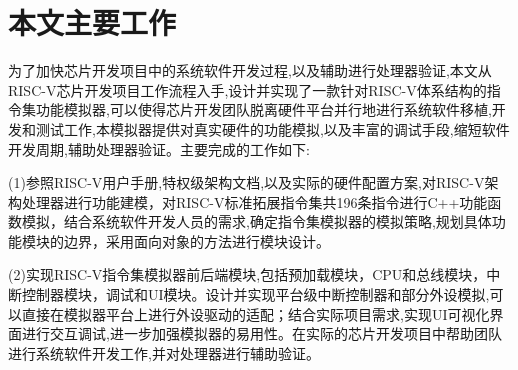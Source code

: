 


\section{本文主要工作}
为了加快芯片开发项目中的系统软件开发过程,以及辅助进行处理器验证,本文从RISC-V芯片开发项目工作流程入手,设计并实现了一款针对RISC-V体系结构的指令集功能模拟器,可以使得芯片开发团队脱离硬件平台并行地进行系统软件移植,开发和测试工作,本模拟器提供对真实硬件的功能模拟,以及丰富的调试手段,缩短软件开发周期,辅助处理器验证。主要完成的工作如下:


(1)参照RISC-V用户手册,特权级架构文档,以及实际的硬件配置方案,对RISC-V架构处理器进行功能建模，对RISC-V标准拓展指令集共196条指令进行C++功能函数模拟，结合系统软件开发人员的需求,确定指令集模拟器的模拟策略,规划具体功能模块的边界，采用面向对象的方法进行模块设计。


(2)实现RISC-V指令集模拟器前后端模块,包括预加载模块，CPU和总线模块，中断控制器模块，调试和UI模块。设计并实现平台级中断控制器和部分外设模拟,可以直接在模拟器平台上进行外设驱动的适配；结合实际项目需求,实现UI可视化界面进行交互调试,进一步加强模拟器的易用性。在实际的芯片开发项目中帮助团队进行系统软件开发工作,并对处理器进行辅助验证。


